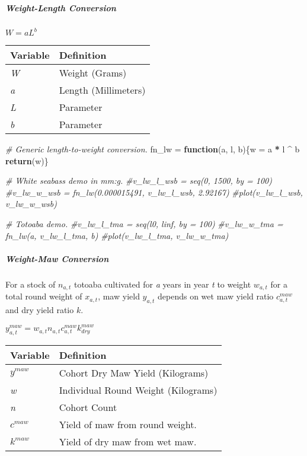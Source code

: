 \documentclass[]{article}
\newenvironment{Shaded}{\begin{snugshade}}{\end{snugshade}}
\newcommand{\KeywordTok}[1]{\textcolor[rgb]{0.13,0.29,0.53}{\textbf{#1}}}
\newcommand{\StringTok}[1]{\textcolor[rgb]{0.31,0.60,0.02}{#1}}
\newcommand{\CommentTok}[1]{\textcolor[rgb]{0.56,0.35,0.01}{\textit{#1}}}
\newcommand{\ControlFlowTok}[1]{\textcolor[rgb]{0.13,0.29,0.53}{\textbf{#1}}}
\newcommand{\OperatorTok}[1]{\textcolor[rgb]{0.81,0.36,0.00}{\textbf{#1}}}
\newcommand{\NormalTok}[1]{#1}
\let\oldsubparagraph\subparagraph
\renewcommand{\subparagraph}[1]{\oldsubparagraph{#1}\mbox{}}
\begin{document}
\subparagraph{Weight-Length Conversion}\label{weight-length-conversion}

\(W = aL^b\)

\begin{longtable}[]{@{}ll@{}}
\toprule
Variable & Definition\tabularnewline
\midrule
\endhead
\emph{W} & Weight (Grams)\tabularnewline
\emph{a} & Length (Millimeters)\tabularnewline
\emph{L} & Parameter\tabularnewline
\emph{b} & Parameter\tabularnewline
\bottomrule
\end{longtable}

\begin{Shaded}
\begin{Highlighting}[]
\CommentTok{# Generic length-to-weight conversion. }
\NormalTok{fn_lw =}\StringTok{ }\ControlFlowTok{function}\NormalTok{(a, l, b)\{w =}\StringTok{ }\NormalTok{a }\OperatorTok{*}\StringTok{ }\NormalTok{l }\OperatorTok{^}\StringTok{ }\NormalTok{b}
                          \KeywordTok{return}\NormalTok{(w)\}}

\CommentTok{# White seabass demo in mm:g.}
\CommentTok{#v_lw_l_wsb = seq(0, 1500, by = 100)}
\CommentTok{#v_lw_w_wsb = fn_lw(0.000015491, v_lw_l_wsb, 2.92167)}
\CommentTok{#plot(v_lw_l_wsb, v_lw_w_wsb)}

\CommentTok{# Totoaba demo.}
\CommentTok{#v_lw_l_tma = seq(l0, linf, by = 100)}
\CommentTok{#v_lw_w_tma = fn_lw(a, v_lw_l_tma, b)}
\CommentTok{#plot(v_lw_l_tma, v_lw_w_tma)}
\end{Highlighting}
\end{Shaded}

\subparagraph{Weight-Maw Conversion}\label{weight-maw-conversion}

For a stock of \(n_{a, t}\) totoaba cultivated for \emph{a} years in
year \emph{t} to weight \(w_{a, t}\) for a total round weight of
\(x_{a, t}\), maw yield \(y_{a, t}\) depends on wet maw yield ratio
\(c^{maw}_{a, t}\) and dry yield ratio \(k\).

\(y^{maw}_{a, t} = w_{a, t}n_{a, t}c^{maw}_{a, t}k^{maw}_{dry}\)

\begin{longtable}[]{@{}ll@{}}
\toprule
Variable & Definition\tabularnewline
\midrule
\endhead
\(y^{maw}\) & Cohort Dry Maw Yield (Kilograms)\tabularnewline
\emph{w} & Individual Round Weight (Kilograms)\tabularnewline
\emph{n} & Cohort Count\tabularnewline
\(c^{maw}\) & Yield of maw from round weight.\tabularnewline
\(k^{maw}\) & Yield of dry maw from wet maw.\tabularnewline
\bottomrule
\end{longtable}
\end{document}
